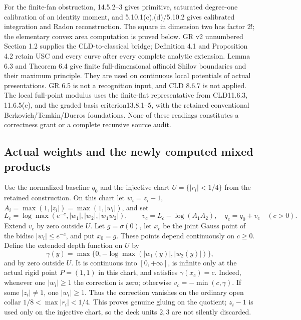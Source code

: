 For the finite-fan obstruction, 14.5.2--3 gives primitive, saturated
degree-one calibration of an identity moment, and 5.10.1(c),(d)/5.10.2
gives calibrated integration and Radon reconstruction. The square in
dimension two has factor $2!$; the elementary convex area computation is
proved below. GR v2 unnumbered Section 1.2 supplies the CLD-to-classical
bridge; Definition 4.1 and Proposition 4.2 retain USC and every curve after
every complete analytic extension. Lemma 6.3 and Theorem 6.4 give finite
full-dimensional affinoid Shilov boundaries and their maximum principle.
They are used on continuous local potentials of actual presentations.
GR 6.5 is not a recognition input, and CLD 8.6.7 is not applied. The local
full-point modulus uses the finite-flat representative from CLD11.6.3,
11.6.5(c), and the graded basis criterion13.8.1--5, with the retained
conventional Berkovich/Temkin/Ducros foundations. None of these readings
constitutes a correctness grant or a complete recursive source audit.

\subsection{Actual weights and the newly computed mixed products}
Use the normalized baseline $q_0$ and the injective chart
$U=\{|r_i|<1/4\}$ from the retained construction. On this chart let
$w_i=z_i-1$, $A_i=\max(1,|z_i|)=\max(1,|w_i|)$, and set
\[
 L_c=\log\max(e^{-c},|w_1|,|w_2|,|w_1w_2|),\qquad
 v_c=L_c-\log(A_1A_2),\quad q_c=q_0+v_c\quad(c>0).
\]
Extend $v_c$ by zero outside $U$. Let $g=\sigma(0)$, let $x_c$ be the
joint Gauss point of the bidisc $|w_i|\le e^{-c}$, and put $x_0=g$.
These points depend continuously on $c\ge0$. Define the extended depth
function on $U$ by
\[
 \gamma(y)=\max\{0,-\log\max(|w_1(y)|,|w_2(y)|)\},
\]
and by zero outside $U$. It is continuous into $[0,+\infty]$, is infinite
only at the actual rigid point $P=(1,1)$ in this chart, and satisfies
$\gamma(x_c)=c$. Indeed, whenever one $|w_i|\ge1$ the correction is zero;
otherwise $v_c=-\min(c,\gamma)$. If some $|z_i|\ne1$, one $|w_i|\ge1$.
Thus the correction vanishes on the ordinary open collar
$1/8<\max|r_i|<1/4$. This proves genuine gluing on the quotient; $z_i-1$
is used only on the injective chart, so the deck units $2,3$ are not
silently discarded.

